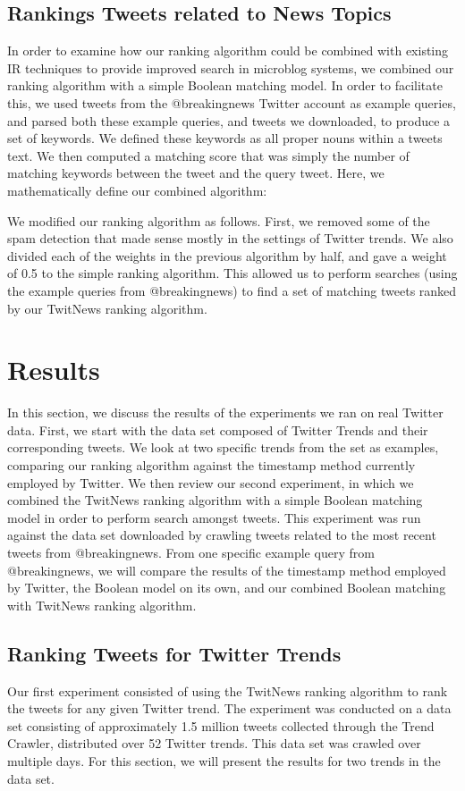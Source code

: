 \documentclass[10pt]{proc}
\begin{document}
  \subsection{Rankings Tweets related to News Topics}
  In order to examine how our ranking algorithm could be combined with existing IR techniques to provide improved search in microblog systems, we combined our ranking algorithm with a simple Boolean matching model. In order to facilitate this, we used tweets from the @breakingnews Twitter account as example queries, and parsed both these example queries, and tweets we downloaded, to produce a set of keywords. We defined these keywords as all proper nouns within a tweets text. We then computed a matching score that was simply the number of matching keywords between the tweet and the query tweet. Here, we mathematically define our combined algorithm: 
  
  
  
  We modified our ranking algorithm as follows. First, we removed some of the spam detection that made sense mostly in the settings of Twitter trends. We also divided each of the weights in the previous algorithm by half, and gave a weight of 0.5 to the simple ranking algorithm. This allowed us to perform searches (using the example queries from @breakingnews) to find a set of matching tweets ranked by our TwitNews ranking algorithm.

\section{Results}

  In this section, we discuss the results of the experiments we ran on real Twitter data. First, we start with the data set composed of Twitter Trends and their corresponding tweets. We look at two specific trends from the set as examples, comparing our ranking algorithm against the timestamp method currently employed by Twitter. We then review our second experiment, in which we combined the TwitNews ranking algorithm with a simple Boolean matching model in order to perform search amongst tweets. This experiment was run against the data set downloaded by crawling tweets related to the most recent tweets from @breakingnews.  From one specific example query from @breakingnews, we will compare the results of the timestamp method employed by Twitter, the Boolean model on its own, and our combined Boolean matching with TwitNews ranking algorithm.
  
  \subsection{Ranking Tweets for Twitter Trends}
  Our first experiment consisted of using the TwitNews ranking algorithm to rank the tweets for any given Twitter trend. The experiment was conducted on a data set consisting of approximately 1.5 million tweets collected through the Trend Crawler, distributed over 52 Twitter trends. This data set was crawled over multiple days. For this section, we will present the results for two trends in the data set.
\end{document}
